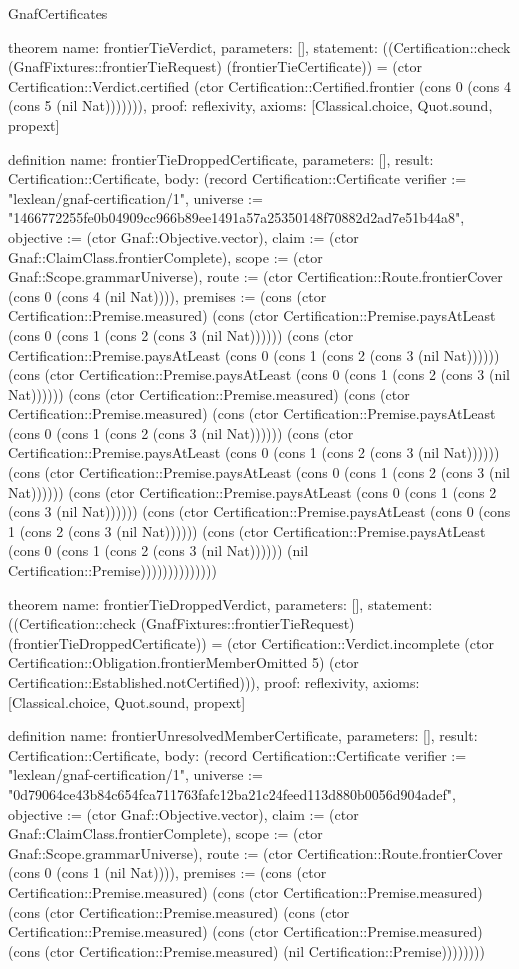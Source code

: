 \begin{lexlean}{GnafCertificates}
\begin{semanticmodule}
theorem{
  name: frontierTieVerdict,
  parameters: [],
  statement: ((Certification::check (GnafFixtures::frontierTieRequest) (frontierTieCertificate)) = (ctor Certification::Verdict.certified (ctor Certification::Certified.frontier (cons 0 (cons 4 (cons 5 (nil Nat))))))),
  proof: reflexivity{},
  axioms: [Classical.choice, Quot.sound, propext]
}

definition{
  name: frontierTieDroppedCertificate,
  parameters: [],
  result: Certification::Certificate,
  body: (record Certification::Certificate {verifier := "lexlean/gnaf-certification/1", universe := "1466772255fe0b04909cc966b89ee1491a57a25350148f70882d2ad7e51b44a8", objective := (ctor Gnaf::Objective.vector), claim := (ctor Gnaf::ClaimClass.frontierComplete), scope := (ctor Gnaf::Scope.grammarUniverse), route := (ctor Certification::Route.frontierCover (cons 0 (cons 4 (nil Nat)))), premises := (cons (ctor Certification::Premise.measured) (cons (ctor Certification::Premise.paysAtLeast (cons 0 (cons 1 (cons 2 (cons 3 (nil Nat)))))) (cons (ctor Certification::Premise.paysAtLeast (cons 0 (cons 1 (cons 2 (cons 3 (nil Nat)))))) (cons (ctor Certification::Premise.paysAtLeast (cons 0 (cons 1 (cons 2 (cons 3 (nil Nat)))))) (cons (ctor Certification::Premise.measured) (cons (ctor Certification::Premise.measured) (cons (ctor Certification::Premise.paysAtLeast (cons 0 (cons 1 (cons 2 (cons 3 (nil Nat)))))) (cons (ctor Certification::Premise.paysAtLeast (cons 0 (cons 1 (cons 2 (cons 3 (nil Nat)))))) (cons (ctor Certification::Premise.paysAtLeast (cons 0 (cons 1 (cons 2 (cons 3 (nil Nat)))))) (cons (ctor Certification::Premise.paysAtLeast (cons 0 (cons 1 (cons 2 (cons 3 (nil Nat)))))) (cons (ctor Certification::Premise.paysAtLeast (cons 0 (cons 1 (cons 2 (cons 3 (nil Nat)))))) (cons (ctor Certification::Premise.paysAtLeast (cons 0 (cons 1 (cons 2 (cons 3 (nil Nat)))))) (nil Certification::Premise)))))))))))))})
}

theorem{
  name: frontierTieDroppedVerdict,
  parameters: [],
  statement: ((Certification::check (GnafFixtures::frontierTieRequest) (frontierTieDroppedCertificate)) = (ctor Certification::Verdict.incomplete (ctor Certification::Obligation.frontierMemberOmitted 5) (ctor Certification::Established.notCertified))),
  proof: reflexivity{},
  axioms: [Classical.choice, Quot.sound, propext]
}

definition{
  name: frontierUnresolvedMemberCertificate,
  parameters: [],
  result: Certification::Certificate,
  body: (record Certification::Certificate {verifier := "lexlean/gnaf-certification/1", universe := "0d79064ce43b84c654fca711763fafc12ba21c24feed113d880b0056d904adef", objective := (ctor Gnaf::Objective.vector), claim := (ctor Gnaf::ClaimClass.frontierComplete), scope := (ctor Gnaf::Scope.grammarUniverse), route := (ctor Certification::Route.frontierCover (cons 0 (cons 1 (nil Nat)))), premises := (cons (ctor Certification::Premise.measured) (cons (ctor Certification::Premise.measured) (cons (ctor Certification::Premise.measured) (cons (ctor Certification::Premise.measured) (cons (ctor Certification::Premise.measured) (cons (ctor Certification::Premise.measured) (nil Certification::Premise)))))))})
}


\end{semanticmodule}
\end{lexlean}
